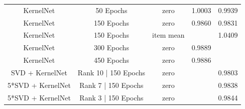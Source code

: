 \documentclass[10pt,conference,compsocconf]{IEEEtran}
\begin{document}
\begin{table}
{\begin{tabular}{|| c | c | c | c | c ||}
                \hline
                KernelNet         & 50 Epochs                         & zero                    & 1.0003                 & 0.9939                  \\
                KernelNet         & 150 Epochs                        & zero                    & 0.9860                 & 0.9831                  \\
                KernelNet         & 150 Epochs                        & item mean               &                        & 1.0409                  \\
                KernelNet         & 300 Epochs                        & zero                    & 0.9889                 &                         \\
                KernelNet         & 450 Epochs                        & zero                    & 0.9886                 &                         \\
                SVD + KernelNet   & Rank 10 | 150 Epochs              & zero                    &                        & 0.9803                  \\
                5*SVD + KernelNet & Rank 7 | 150 Epochs               & zero                    &                        & 0.9838                  \\
                5*SVD + KernelNet & Rank 3 | 150 Epochs               & zero                    &                        & 0.9844                  \\


\end{tabular}}
\end{table}
\end{document}

